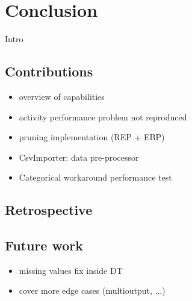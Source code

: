 \chapter{Conclusion}\label{cha:conclusion}
Intro

\section{Contributions}
\begin{itemize}
    \item overview of capabilities
    \item activity performance problem not reproduced
    \item pruning implementation (REP + EBP)
    \item CsvImporter: data pre-processor
    \item Categorical workaround performance test
\end{itemize}

\section{Retrospective}
\section{Future work}
\begin{itemize}
    \item missing values fix inside DT
    \item cover more edge cases (multioutput, ...)
\end{itemize}
